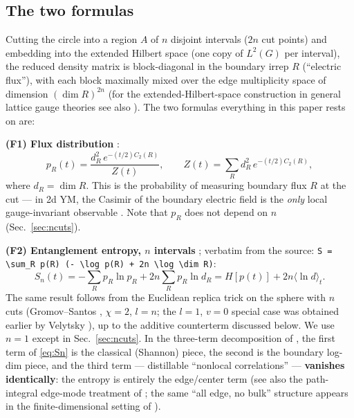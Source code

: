 \documentclass[11pt]{article}
\theoremstyle{remark}
\theoremstyle{plain}
\begin{document}
\subsection{The two formulas}\label{sec:formulas}

Cutting the circle into a region $A$ of $n$ disjoint intervals ($2n$ cut points) and embedding into the extended Hilbert space (one copy of $L^2(G)$ per interval), the reduced density matrix is block-diagonal in the boundary irrep $R$ (``electric flux''), with each block maximally mixed over the edge multiplicity space of dimension $(\dim R)^{2n}$ \cite{D14} (for the extended-Hilbert-space construction in general lattice gauge theories see also \cite{D11, GST15}). The two formulas everything in this paper rests on are:

\textbf{(F1) Flux distribution} \cite[eq.~(pr)]{D14}:
\begin{equation}\label{eq:flux}
p_R(t) = \frac{d_R^2\, e^{-(t/2)C_2(R)}}{Z(t)}, \qquad Z(t) = \sum_R d_R^2\, e^{-(t/2)C_2(R)},
\end{equation}
where $d_R = \dim R$. This is the probability of measuring boundary flux $R$ at the cut --- in 2d YM, the Casimir of the boundary electric field is the \emph{only} local gauge-invariant observable \cite{D14}. Note that $p_R$ does not depend on $n$ (Sec.~\ref{sec:ncuts}).

\textbf{(F2) Entanglement entropy, $n$ intervals} \cite[eq.~(YM2entropy)]{D14}; verbatim from the source: \verb|S = \sum_R p(R) (- \log p(R) + 2n \log \dim R)|:
\begin{equation}\label{eq:Sn}
S_n(t) = -\sum_R p_R \ln p_R + 2n \sum_R p_R \ln d_R = H[p(t)] + 2n\langle \ln d\rangle_t.
\end{equation}
The same result follows from the Euclidean replica trick on the sphere with $n$ cuts (Gromov--Santos \cite[eq.~(answ)]{GS14}, $\chi = 2$, $l = n$; the $l = 1$, $v = 0$ special case was obtained earlier by Velytsky \cite{V08}), up to the additive counterterm discussed below. We use $n = 1$ except in Sec.~\ref{sec:ncuts}. In the three-term decomposition of \cite{D11}, the first term of \eqref{eq:Sn} is the classical (Shannon) piece, the second is the boundary log-dim piece, and the third term --- distillable ``nonlocal correlations'' --- \textbf{vanishes identically}: the entropy is entirely the edge/center term (see also the path-integral edge-mode treatment of \cite{BMV18}; the same ``all edge, no bulk'' structure appears in the finite-dimensional setting of \cite{P2}).
\end{document}
